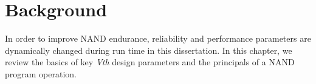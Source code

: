 
\chapter{Background} 
\label{chap:Background}


In order to improve NAND endurance, reliability and performance parameters are dynamically changed during run time in this dissertation.
In this chapter, we review the basics of key \textit{Vth} design parameters and the principals of a NAND program operation.

